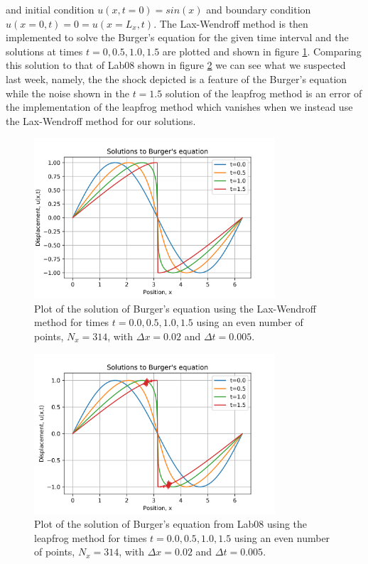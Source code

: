 \documentclass{article}
\begin{document}
and initial condition $u(x,t=0)=sin(x)$ and boundary condition $u(x=0,t)=0=u(x=L_x,t)$. The Lax-Wendroff method is then implemented to solve the Burger's equation for the given time interval and the solutions at times $t=0, 0.5, 1.0, 1.5$ are plotted and shown in figure \ref{fig:burgers_lax}. Comparing this solution to that of Lab08 shown in figure \ref{fig:burgers_leapfrog} we can see what we suspected last week, namely, the the shock depicted is a feature of the Burger's equation while the noise shown in the $t=1.5$ solution of the leapfrog method is an error of the implementation of the leapfrog method which vanishes when we instead use the Lax-Wendroff method for our solutions.

\begin{figure}[H]
	\centering
	\includegraphics[width=0.8\textwidth]{../images/burgers.png}
	\caption{Plot of the solution of Burger's equation using the Lax-Wendroff method for times $t=0.0,0.5,1.0,1.5$ using an even number of points, $N_x=314$, with $\Delta x=0.02$ and $\Delta t=0.005$.}
	\label{fig:burgers_lax}
\end{figure}

\begin{figure}[H]
	\centering
	\includegraphics[width=0.8\textwidth]{../images/burgers_old.png}
	\caption{Plot of the solution of Burger's equation from Lab08 using the leapfrog method for times $t=0.0,0.5,1.0,1.5$ using an even number of points, $N_x=314$, with $\Delta x=0.02$ and $\Delta t=0.005$.}
	\label{fig:burgers_leapfrog}
\end{figure}
\end{document}
